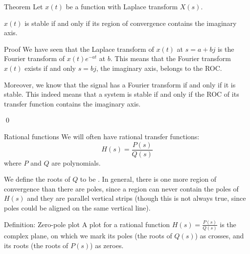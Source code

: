 \documentclass[a4paper]{article}
\begin{document}
\begin{parag}{Theorem}
    Let $x\left(t\right)$ be a function with Laplace transform $X\left(s\right)$.

    $x\left(t\right)$ is stable if and only if its region of convergence contains the imaginary axis.

    \begin{subparag}{Proof}
        We have seen that the Laplace transform of $x\left(t\right)$ at $s = a + bj$ is the Fourier transform of $x\left(t\right)e^{-at}$ at $b$. This means that the Fourier transform $x\left(t\right)$ exists if and only $s = bj$, the imaginary axis, belongs to the ROC. 

        Moreover, we know that the signal has a Fourier transform if and only if it is stable. This indeed means that a system is stable if and only if the ROC of its transfer function contains the imaginary axis.

        \qed
    \end{subparag}
    
\end{parag}

\begin{parag}{Rational functions}
    We will often have rational transfer functions: 
    \[H\left(s\right) = \frac{P\left(s\right)}{Q\left(s\right)}\]
    where $P$ and $Q$ are polynomials.

    We define the roots of $Q$ to be . In general, there is one more region of convergence than there are poles, since a region can never contain the poles of $H\left(s\right)$ and they are parallel vertical strips (though this is not always true, since poles could be aligned on the same vertical line). 
\end{parag}

\begin{parag}{Definition: Zero-pole plot}
    A  plot for a rational function $H\left(s\right) = \frac{P\left(s\right)}{Q\left(s\right)}$ is the complex plane, on which we mark its poles (the roots of $Q\left(s\right)$) as crosses, and its roots (the roots of $P\left(s\right)$) as zeroes.
\end{parag}
\end{document}
